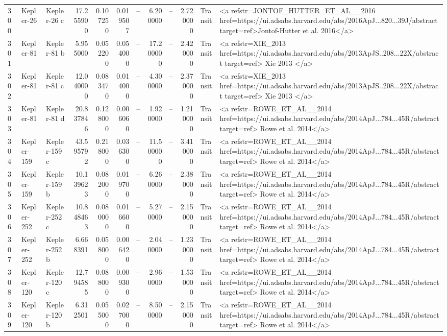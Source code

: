 \begin{tabular}{lllrrrrrrrll}
300 & Kepler-26 & Kepler-26 c & 17.255900 & 0.107250 & 0.019507 & -- & 6.200000 & -- & 2.720000 & Transit & <a refstr=JONTOF_HUTTER_ET_AL__2016 href=https://ui.adsabs.harvard.edu/abs/2016ApJ...820...39J/abstract target=ref>Jontof-Hutter et al. 2016</a> \\
301 & Kepler-81 & Kepler-81 b & 5.955000 & 0.052200 & 0.054000 & -- & 17.200000 & -- & 2.420000 & Transit & <a refstr=XIE_2013 href=https://ui.adsabs.harvard.edu/abs/2013ApJS..208...22X/abstract target=ref> Xie 2013 </a> \\
302 & Kepler-81 & Kepler-81 c & 12.040000 & 0.083470 & 0.014000 & -- & 4.300000 & -- & 2.370000 & Transit & <a refstr=XIE_2013 href=https://ui.adsabs.harvard.edu/abs/2013ApJS..208...22X/abstract target=ref> Xie 2013 </a> \\
303 & Kepler-81 & Kepler-81 d & 20.837846 & 0.128000 & 0.006060 & -- & 1.920000 & -- & 1.210000 & Transit & <a refstr=ROWE_ET_AL__2014 href=https://ui.adsabs.harvard.edu/abs/2014ApJ...784...45R/abstract target=ref> Rowe et al. 2014</a> \\
304 & Kepler-159 & Kepler-159 c & 43.595792 & 0.218000 & 0.036300 & -- & 11.500000 & -- & 3.410000 & Transit & <a refstr=ROWE_ET_AL__2014 href=https://ui.adsabs.harvard.edu/abs/2014ApJ...784...45R/abstract target=ref> Rowe et al. 2014</a> \\
305 & Kepler-159 & Kepler-159 b & 10.139623 & 0.082000 & 0.019700 & -- & 6.260000 & -- & 2.380000 & Transit & <a refstr=ROWE_ET_AL__2014 href=https://ui.adsabs.harvard.edu/abs/2014ApJ...784...45R/abstract target=ref> Rowe et al. 2014</a> \\
306 & Kepler-252 & Kepler-252 c & 10.848463 & 0.080000 & 0.016600 & -- & 5.270000 & -- & 2.150000 & Transit & <a refstr=ROWE_ET_AL__2014 href=https://ui.adsabs.harvard.edu/abs/2014ApJ...784...45R/abstract target=ref> Rowe et al. 2014</a> \\
307 & Kepler-252 & Kepler-252 b & 6.668391 & 0.058000 & 0.006420 & -- & 2.040000 & -- & 1.230000 & Transit & <a refstr=ROWE_ET_AL__2014 href=https://ui.adsabs.harvard.edu/abs/2014ApJ...784...45R/abstract target=ref> Rowe et al. 2014</a> \\
308 & Kepler-120 & Kepler-120 c & 12.794585 & 0.088000 & 0.009300 & -- & 2.960000 & -- & 1.530000 & Transit & <a refstr=ROWE_ET_AL__2014 href=https://ui.adsabs.harvard.edu/abs/2014ApJ...784...45R/abstract target=ref> Rowe et al. 2014</a> \\
309 & Kepler-120 & Kepler-120 b & 6.312501 & 0.055000 & 0.027000 & -- & 8.500000 & -- & 2.150000 & Transit & <a refstr=ROWE_ET_AL__2014 href=https://ui.adsabs.harvard.edu/abs/2014ApJ...784...45R/abstract target=ref> Rowe et al. 2014</a> \\

\end{tabular}
